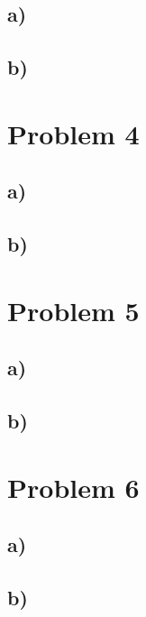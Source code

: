 \documentclass[english,notitlepage]{revtex4-1}  %
\begin{document}
\subsection*{a)}
\subsection*{b)}



\section*{Problem 4}

\subsection*{a)}
\subsection*{b)}



\section*{Problem 5}

\subsection*{a)}
\subsection*{b)}
\section*{Problem 6}


\subsection*{a)}
\subsection*{b)}



   
\end{document}
